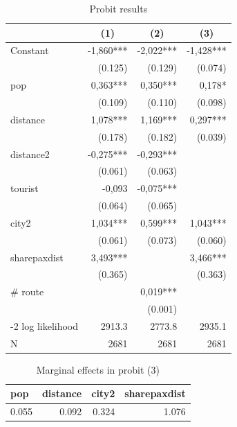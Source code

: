 \documentclass[12pt,english]{article}
\begin{document}
\begin{enumerate}
\begin{table}[H]
  \centering
  \caption{Probit results}
    \begin{tabular}{lrrr}
    \hline
          & \multicolumn{1}{c}{(1)} & \multicolumn{1}{c}{(2)} & \multicolumn{1}{c}{(3)} \\
    \hline
    Constant & -1,860*** & -2,022*** & -1,428*** \\
          & (0.125) & (0.129) & (0.074) \\
    pop   & 0,363*** & 0,350*** & 0,178* \\
          & (0.109) & (0.110) & (0.098) \\
    distance & 1,078*** & 1,169*** & 0,297*** \\
          & (0.178) & (0.182) & (0.039) \\
    distance2 & -0,275*** & -0,293*** &  \\
          & (0.061) & (0.063) &  \\
    tourist & -0,093 & -0,075*** &  \\
          & (0.064) & (0.065) &  \\
    city2 & 1,034*** & 0,599*** & 1,043*** \\
          & (0.061) & (0.073) & (0.060) \\
    sharepaxdist & 3,493*** &       & 3,466*** \\
          & (0.365) &       & (0.363) \\
    \# route &       & 0,019*** &  \\
          &       & (0.001) &  \\
          \hline
    -2 log likelihood & 2913.3 & 2773.8 & 2935.1 \\
    N     & 2681  & 2681  & 2681 \\
    \hline
    \end{tabular}%
  \label{t5}%
\end{table}

\begin{table}[H]
  \centering
  \caption{Marginal effects in probit (3)}
    \begin{tabular}{lrrr}
        \hline
    pop   & distance & city2 & sharepaxdist \\
    \hline
    0.055 & 0.092 & 0.324 & 1.076 \\
    \hline
    \end{tabular}%
  \label{mfx}%
\end{table}



\end{enumerate}
\end{document}
